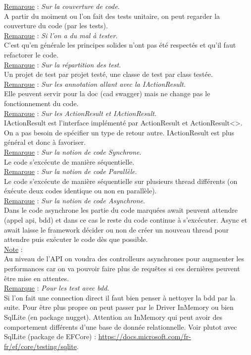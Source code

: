 \documentclass[a4paper,12pt,twoside]{article}
\newcommand{\incode}[1]{{\footnotesize\ttfamily #1}} %
\newcommand{\rem}[2]{\noindent\underline{Remarque} : \textit{#1}.\\ \indent #2}
\newcommand{\note}[1]{\noindent\underline{Note} : \\ \indent #1}
\begin{document}
\rem{Sur la couverture de code}{A partir du moiment ou l'on fait des tests unitaire, on peut regarder la couverture du code (par les tests).}\\

\rem{Si l'on a du mal à tester}{C'est qu'en générale les principes solides n'ont pas été respectés et qu'il faut refactorer le code.}\\

\rem{Sur la répartition des test}{Un projet de test par projet testé, une classe de test par class testée.}\\

\rem{Sur les annotation allant avec la IActionResult}{Elle peuvent servir pour la doc (cad swagger) mais ne change pas le fonctionnement du code.}\\

\rem{Sur les ActionResult et IActionResult}{IActionResult est l'interface implémenté par ActionResult et ActionResult<>. On a pas besoin de spécifier un type de retour autre. IActionResult est plus général et donc à favoriser.}\\

\rem{Sur la notion de code Synchrone}{Le code s'excécute de manière séquentielle.}\\

\rem{Sur la notion de code Parallèle}{Le code s'excécute de manière séquentielle sur plusieurs thread différents (on éxécute deux codes identique ou non en parallèle).}\\

\rem{Sur la notion de code Asynchrone}{Dans le code asynchrone les partie du code marquées \incode{await} peuvent attendre (appel api, bdd) et dans ce cas le reste du code continue à s'excécuter. Async et await laisse le framework décider ou non de créer un nouveau thread pour attendre puis exécuter le code dès que possible.}\\

\note{Au niveau de l'API on voudra des controlleurs asynchrones pour augmenter les performances car on va pouvoir faire plus de requêtes si ces dernières peuvent être mise en attentes.}\\

\rem{Pour les test avec bdd}{Si l'on fait une connection direct il faut bien penser à nettoyer la bdd par la suite. Pour être plus propre on peut passer par le Driver InMemory ou bien SqlLite (en package nugget). Attention au InMemory qui peut avoir des comportement différents d'une base de donnée relationnelle. Voir plutot avec SqlLite (package de EFCore) : \url{https://docs.microsoft.com/fr-fr/ef/core/testing/sqlite}.}\\
\end{document}
